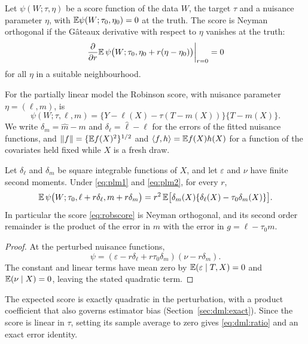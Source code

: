 \begin{definition}
Let $\psi(W; \tau, \eta)$ be a score function of the data $W$, the target $\tau$ and a nuisance parameter $\eta$, with $\mathbb{E}\psi(W; \tau_0, \eta_0) = 0$ at the truth. The score is Neyman orthogonal if the G\^ateaux derivative with respect to $\eta$ vanishes at the truth:
\[
\left.\frac{\partial}{\partial r} \mathbb{E}\, \psi\bigl(W; \tau_0, \eta_0 + r(\eta - \eta_0)\bigr)\right|_{r=0} = 0
\]
for all $\eta$ in a suitable neighbourhood.
\end{definition}

For the partially linear model the Robinson score, with nuisance parameter $\eta = (\ell, m)$, is
\begin{equation}
\psi(W; \tau, \ell, m) = \{Y - \ell(X) - \tau(T - m(X))\}\{T - m(X)\}.
\label{eq:robscore}
\end{equation}
We write $\delta_m = \hat m - m$ and $\delta_\ell = \hat\ell - \ell$ for the errors of the fitted nuisance functions, and $\|f\| = \{\mathbb{E} f(X)^2\}^{1/2}$ and $\langle f, h\rangle = \mathbb{E} f(X)h(X)$ for a function of the covariates held fixed while $X$ is a fresh draw.

\begin{proposition}\label{dml:prop:orth}
Let $\delta_\ell$ and $\delta_m$ be square integrable functions of $X$, and let $\varepsilon$ and $\nu$ have finite second moments. Under \eqref{eq:plm1} and \eqref{eq:plm2}, for every $r$,
\[
\mathbb{E}\,\psi\bigl(W; \tau_0, \ell + r\delta_\ell, m + r\delta_m\bigr) = r^2\,\mathbb{E}\bigl[\delta_m(X)\{\delta_\ell(X) - \tau_0\delta_m(X)\}\bigr].
\]
In particular the score \eqref{eq:robscore} is Neyman orthogonal, and its second order remainder is the product of the error in $m$ with the error in $g = \ell - \tau_0 m$.
\end{proposition}

\begin{proof}
At the perturbed nuisance functions,
\[
\psi = (\varepsilon - r\delta_\ell + r\tau_0\delta_m)(\nu - r\delta_m).
\]
The constant and linear terms have mean zero by $\mathbb{E}(\varepsilon \mid T, X) = 0$ and $\mathbb{E}(\nu \mid X) = 0$, leaving the stated quadratic term.
\end{proof}

The expected score is exactly quadratic in the perturbation, with a product coefficient that also governs estimator bias (Section~\ref{sec:dml:exact}). Since the score is linear in $\tau$, setting its sample average to zero gives \eqref{eq:dml:ratio} and an exact error identity.


